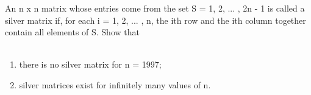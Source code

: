 
\item An n x n matrix whose entries come from the set S = {1, 2, ... , 2n - 1} is called a silver matrix if, for each i = 1, 2, ... , n, the ith row and the ith column together contain all elements of S. Show that\\
\\ \begin{enumerate}
\item there is no silver matrix for n = 1997;
\item silver matrices exist for infinitely many values of n.
\end{enumerate}




